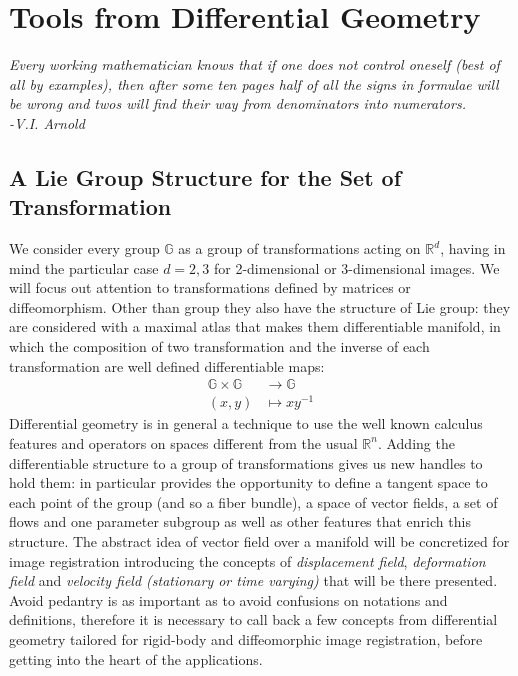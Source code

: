 \chapter{Tools from Differential Geometry}\label{ch:tools}

\begin{flushright}
	\emph{Every working mathematician knows that if one does not control oneself (best of all by examples), then after some ten pages half of all the signs in formulae will be wrong and twos will find their way from denominators into numerators. \\ -V.I. Arnold}
\end{flushright}

\section{A Lie Group Structure for the Set of Transformation}\label{se:finite_lie_group}

We consider every group $\mathbb{G}$ as a group of transformations acting on $\mathbb{R}^{d}$, having in mind the particular case $d=2,3$ for 2-dimensional or 3-dimensional images.
We will focus out attention to transformations defined by matrices or diffeomorphism. Other than group they also have the structure of Lie group: they are considered with a maximal atlas that makes them differentiable manifold, in which the composition of two transformation and the inverse of each transformation are well defined differentiable maps:
\begin{align*}
\mathbb{G} \times \mathbb{G} & \longrightarrow  \mathbb{G}    \\
(x,y) &\longmapsto  x y^{-1}
\end{align*}
Differential geometry is in general a technique to use the well known calculus features and operators on spaces different from the usual $\mathbb{R}^{n}$. Adding the differentiable structure to a group of transformations gives us new handles to hold them: in particular provides the opportunity to define a tangent space to each point of the group (and so a fiber bundle), a space of vector fields, a set of flows and one parameter subgroup as well as other features that enrich this structure. The abstract idea of vector field over a manifold will be concretized for image registration introducing the concepts of \emph{displacement field}, \emph{deformation field} and \emph{velocity field (stationary or time varying)} that will be there presented. Avoid pedantry is as important as to avoid confusions on notations and definitions, therefore it is necessary to call back a few concepts from differential geometry tailored for rigid-body and diffeomorphic image registration, before getting into the heart of the applications. 

